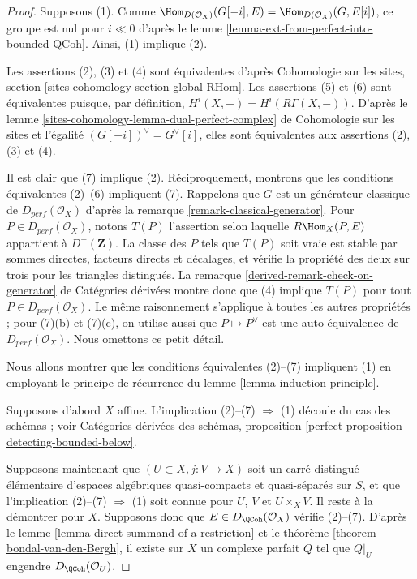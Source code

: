 \begin{proof}
Supposons (1). Comme
$\Hom_{D(\mathcal{O}_X)}(G[-i],E)=\Hom_{D(\mathcal{O}_X)}(G,E[i])$, ce groupe
est nul pour $i\ll0$ d'apr\`es le lemme
\ref{lemma-ext-from-perfect-into-bounded-QCoh}. Ainsi, (1) implique (2).

\medskip\noindent
Les assertions (2), (3) et (4) sont \'equivalentes d'apr\`es Cohomologie sur
les sites, section \ref{sites-cohomology-section-global-RHom}.
Les assertions (5) et (6) sont \'equivalentes puisque, par d\'efinition,
$H^i(X,-)=H^i(R\Gamma(X,-))$. D'apr\`es le lemme
\ref{sites-cohomology-lemma-dual-perfect-complex} de Cohomologie sur les sites
et l'\'egalit\'e $(G[-i])^\vee=G^\vee[i]$, elles sont \'equivalentes aux
assertions (2), (3) et (4).

\medskip\noindent
Il est clair que (7) implique (2). R\'eciproquement, montrons que les conditions
\'equivalentes (2)--(6) impliquent (7). Rappelons que $G$ est un g\'en\'erateur
classique de $D_{perf}(\mathcal{O}_X)$ d'apr\`es la remarque
\ref{remark-classical-generator}. Pour $P\in D_{perf}(\mathcal{O}_X)$, notons
$T(P)$ l'assertion selon laquelle $R\Hom_X(P,E)$ appartient \`a
$D^+(\mathbf{Z})$. La classe des $P$ tels que $T(P)$ soit vraie est stable par
sommes directes, facteurs directs et d\'ecalages, et v\'erifie la propri\'et\'e des
deux sur trois pour les triangles distingu\'es. La remarque
\ref{derived-remark-check-on-generator} de Cat\'egories d\'eriv\'ees montre donc
que (4) implique $T(P)$ pour tout $P\in D_{perf}(\mathcal{O}_X)$. Le m\^eme
raisonnement s'applique \`a toutes les autres propri\'et\'es ; pour (7)(b) et
(7)(c), on utilise aussi que $P\mapsto P^\vee$ est une auto-\'equivalence de
$D_{perf}(\mathcal{O}_X)$. Nous omettons ce petit d\'etail.

\medskip\noindent
Nous allons montrer que les conditions \'equivalentes (2)--(7) impliquent (1)
en employant le principe de r\'ecurrence du lemme
\ref{lemma-induction-principle}.

\medskip\noindent
Supposons d'abord $X$ affine. L'implication (2)--(7) $\Rightarrow$ (1) d\'ecoule
du cas des sch\'emas ; voir Cat\'egories d\'eriv\'ees des sch\'emas, proposition
\ref{perfect-proposition-detecting-bounded-below}.

\medskip\noindent
Supposons maintenant que $(U\subset X,j:V\to X)$ soit un carr\'e distingu\'e
\'el\'ementaire d'espaces alg\'ebriques quasi-compacts et quasi-s\'epar\'es sur
$S$, et que l'implication (2)--(7) $\Rightarrow$ (1) soit connue pour $U$, $V$
et $U\times_XV$. Il reste \`a la d\'emontrer pour $X$. Supposons donc que
$E\in D_\QCoh(\mathcal{O}_X)$ v\'erifie (2)--(7). D'apr\`es le lemme
\ref{lemma-direct-summand-of-a-restriction} et le th\'eor\`eme
\ref{theorem-bondal-van-den-Bergh}, il existe sur $X$ un complexe parfait $Q$
tel que $Q|_U$ engendre $D_\QCoh(\mathcal{O}_U)$.


\end{proof}
